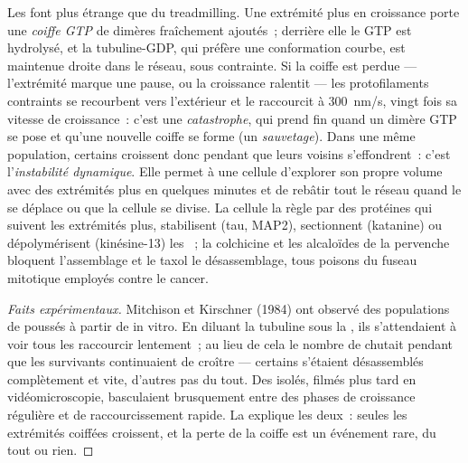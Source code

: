 \begin{definition}\label{def:b3:cytoskeleton-motility:instability}
Les  font plus étrange que du treadmilling. Une extrémité
plus en croissance porte une \emph{coiffe GTP} de dimères fraîchement
ajoutés~; derrière elle le GTP est hydrolysé, et la tubuline-GDP, qui
préfère une conformation courbe, est maintenue droite dans le réseau,
sous contrainte. Si la coiffe est perdue --- l'extrémité marque une
pause, ou la croissance ralentit --- les protofilaments contraints se
recourbent vers l'extérieur et le  raccourcit à
\qty{300}{nm/s}, vingt fois sa vitesse de croissance~: c'est une
\emph{catastrophe}, qui prend fin quand un dimère GTP se pose et
qu'une nouvelle coiffe se forme (un \emph{sauvetage}). Dans une même
population, certains  croissent donc pendant que leurs
voisins s'effondrent~: c'est l'\emph{instabilité dynamique}. Elle
permet à une cellule d'explorer son propre volume avec des extrémités
plus en quelques minutes et de rebâtir tout le réseau quand le
 se déplace ou que la cellule se divise. La cellule la règle
par des protéines qui suivent les extrémités plus, stabilisent (tau,
MAP2), sectionnent (katanine) ou dépolymérisent (kinésine-13) les
~; la colchicine et les alcaloïdes de la pervenche bloquent
l'assemblage et le taxol le désassemblage, tous poisons du fuseau
mitotique employés contre le cancer.
\end{definition}

\begin{proof}[Faits expérimentaux]
Mitchison et Kirschner (1984) ont observé des populations de
 poussés à partir de  in vitro. En diluant la
tubuline sous la , ils s'attendaient à voir tous
les  raccourcir lentement~; au lieu de cela le nombre de
 chutait pendant que les survivants continuaient de
croître --- certains s'étaient désassemblés complètement et vite,
d'autres pas du tout. Des  isolés, filmés plus tard en
vidéomicroscopie, basculaient brusquement entre des phases de
croissance régulière et de raccourcissement rapide. La 
explique les deux~: seules les extrémités coiffées croissent, et la
perte de la coiffe est un événement rare, du tout ou rien.
\end{proof}

